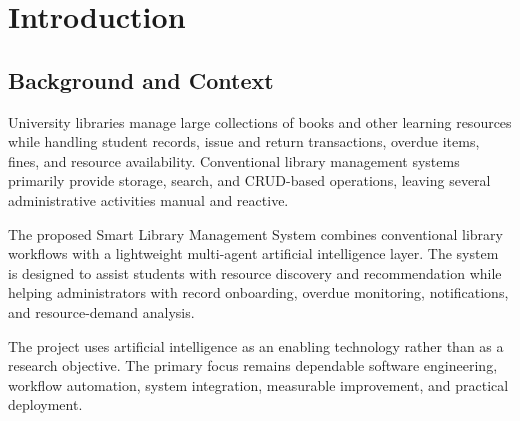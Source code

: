 \documentclass{tietreport}
\author{%
    \texttt{1024160010} Arnav Agarwal \\
    \texttt{1024160135} Aradhya Goyal \\
    \texttt{1024160025} Amanjot Kaur Sidhu%
}
\begin{document}

\maketitle


\tableofcontents


\listoffigures


\chapter{Introduction}

\section{Background and Context}

University libraries manage large collections of books and other learning
resources while handling student records, issue and return transactions,
overdue items, fines, and resource availability. Conventional library
management systems primarily provide storage, search, and CRUD-based
operations, leaving several administrative activities manual and reactive.

The proposed Smart Library Management System combines conventional library
workflows with a lightweight multi-agent artificial intelligence layer. The
system is designed to assist students with resource discovery and
recommendation while helping administrators with record onboarding,
overdue monitoring, notifications, and resource-demand analysis.

The project uses artificial intelligence as an enabling technology rather
than as a research objective. The primary focus remains dependable
software engineering, workflow automation, system integration, measurable
improvement, and practical deployment.
\end{document}
